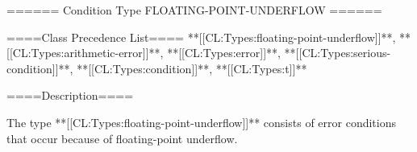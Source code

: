 ====== Condition Type FLOATING-POINT-UNDERFLOW ======

====Class Precedence List==== **[[CL:Types:floating-point-underflow]]**, **[[CL:Types:arithmetic-error]]**, **[[CL:Types:error]]**, **[[CL:Types:serious-condition]]**, **[[CL:Types:condition]]**, **[[CL:Types:t]]**

====Description====

The type **[[CL:Types:floating-point-underflow]]** consists of error conditions that occur because of floating-point underflow.

